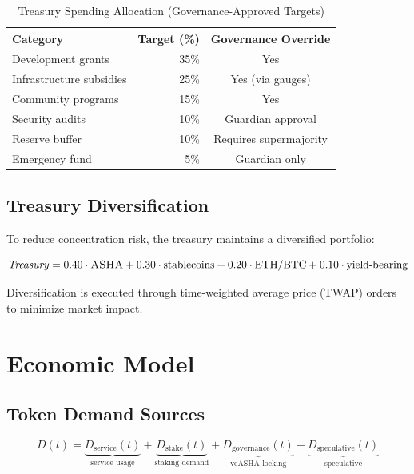 \documentclass[11pt,a4paper]{article}
\newcommand{\asha}{\textsc{ASHA}\xspace}
\begin{document}
\begin{table}[H]
\centering
\caption{Treasury Spending Allocation (Governance-Approved Targets)}
\label{tab:treasury}
\begin{tabular}{lrc}
\toprule
\textbf{Category} & \textbf{Target (\%)} & \textbf{Governance Override} \\
\midrule
Development grants & 35\% & Yes \\
Infrastructure subsidies & 25\% & Yes (via gauges) \\
Community programs & 15\% & Yes \\
Security audits & 10\% & Guardian approval \\
Reserve buffer & 10\% & Requires supermajority \\
Emergency fund & 5\% & Guardian only \\
\bottomrule
\end{tabular}
\end{table}

\subsection{Treasury Diversification}

To reduce concentration risk, the treasury maintains a diversified portfolio:

\begin{equation}
    \mathit{Treasury} = 0.40 \cdot \asha + 0.30 \cdot \text{stablecoins} + 0.20 \cdot \text{ETH/BTC} + 0.10 \cdot \text{yield-bearing}
\end{equation}

Diversification is executed through time-weighted average price (TWAP) orders to minimize market impact.

\section{Economic Model}

\subsection{Token Demand Sources}

\begin{equation}
    D(t) = \underbrace{D_{\text{service}}(t)}_{\text{service usage}} + \underbrace{D_{\text{stake}}(t)}_{\text{staking demand}} + \underbrace{D_{\text{governance}}(t)}_{\text{veASHA locking}} + \underbrace{D_{\text{speculative}}(t)}_{\text{speculative}}
\end{equation}
\end{document}
